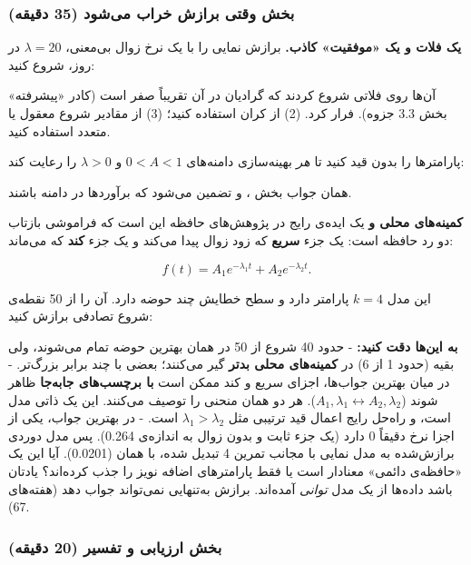 \subsubsection{\texorpdfstring{بخش  وقتی برازش خراب می‌شود (35
دقیقه)}{بخش D: وقتی برازش خراب می‌شود (35 دقیقه)}}

\textbf{ یک فلات و یک «موفقیت» کاذب.} برازش نمایی را با یک نرخ
زوال بی‌معنی، \(\lambda = 20\) در روز، شروع کنید:

آن‌ها روی فلاتی شروع کردند که گرادیان در آن تقریباً صفر است (کادر
«پیشرفته» بخش 3.3 جزوه).  فرار کرد. (2) از کران استفاده
کنید؛ (3) از مقادیر شروع معقول یا متعدد استفاده کنید.

\textbf{} پارامترها را بدون قید کنید تا
\emph{هر} بهینه‌سازی دامنه‌های \(0 < A < 1\) و \(\lambda > 0\) را رعایت
کند:

همان جواب بخش ، و تضمین می‌شود که برآوردها در دامنه باشند.

\textbf{ کمینه‌های محلی و } یک ایده‌ی رایج در
پژوهش‌های حافظه این است که فراموشی بازتاب دو رد حافظه 
است: یک جزء \textbf{سریع} که زود زوال پیدا می‌کند و یک جزء \textbf{کند}
که می‌ماند:

\[
f(t) = A_1 e^{-\lambda_1 t} + A_2 e^{-\lambda_2 t}.
\]

این مدل \(k = 4\) پارامتر دارد و سطح خطایش چند حوضه دارد. آن را از 50
نقطه‌ی شروع تصادفی برازش کنید:

\textbf{به این‌ها دقت کنید:} - حدود 40 شروع از 50 در همان بهترین حوضه
تمام می‌شوند، ولی بقیه (حدود 1 از 6) در \textbf{کمینه‌های محلی بدتر} گیر
می‌کنند؛ بعضی با  چند برابر بزرگ‌تر. - در میان بهترین جواب‌ها،
اجزای سریع و کند ممکن است \textbf{با برچسب‌های جابه‌جا} ظاهر شوند
(\(A_1,\allowbreak \lambda_1 \leftrightarrow A_2,\allowbreak \lambda_2\)). هر دو همان منحنی را
توصیف می‌کنند. این یک  ذاتی مدل است، و راه‌حل رایج
اعمال قید ترتیبی مثل \(\lambda_1 > \lambda_2\) است. - در بهترین جواب،
یکی از اجزا نرخ دقیقاً 0 دارد (یک جزء ثابت و بدون زوال به اندازه‌ی 0.264).
پس مدل دوردی برازش‌شده به مدل نمایی با مجانب تمرین 4 تبدیل شده، با همان
 (0.0201). آیا این یک «حافظه‌ی دائمی» معنادار است یا فقط
پارامترهای اضافه نویز را جذب کرده‌اند؟ یادتان باشد داده‌ها از یک مدل
\emph{توانی} آمده‌اند. برازش به‌تنهایی نمی‌تواند جواب دهد (هفته‌های 6\lr{--}7).

\subsubsection{\texorpdfstring{بخش  ارزیابی و تفسیر (20
دقیقه)}{بخش E: ارزیابی و تفسیر (20 دقیقه)}}

